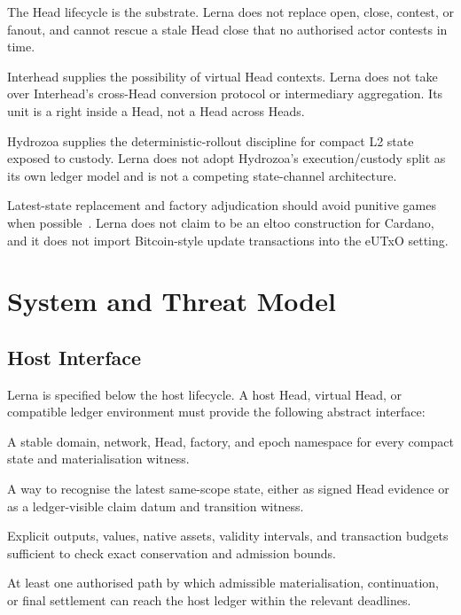 \documentclass[a4paper,11pt]{article}
\theoremstyle{definition}
\theoremstyle{plain}
\theoremstyle{remark}
\begin{document}
\begin{description}[leftmargin=3.8cm,style=nextline]
\item[From Hydra Head.]
The Head lifecycle is the substrate. Lerna does not replace open, close,
contest, or fanout, and cannot rescue a stale Head close that no authorised
actor contests in time.

\item[From Interhead.]
Interhead supplies the possibility of virtual Head contexts. Lerna does not
take over Interhead's cross-Head conversion protocol or intermediary
aggregation. Its unit is a right inside a Head, not a Head across Heads.

\item[From Hydrozoa.]
Hydrozoa supplies the deterministic-rollout discipline for compact L2 state
exposed to custody. Lerna does not adopt Hydrozoa's execution/custody split as
its own ledger model and is not a competing state-channel architecture.

\item[From eltoo, factories, and Perun.]
Latest-state replacement and factory adjudication should avoid punitive games
when possible~\cite{eltoo,factories,perun}. Lerna does not claim to be an eltoo
construction for Cardano, and it does not import Bitcoin-style update
transactions into the eUTxO setting.
\end{description}

\section{System and Threat Model}
\label{sec:system}

\subsection{Host Interface}
\label{sec:host-interface}

Lerna is specified below the host lifecycle. A host Head, virtual Head, or
compatible ledger environment must provide the following abstract interface:

\begin{description}[leftmargin=3.2cm,style=nextline]
\item[Scoped identity.]
A stable domain, network, Head, factory, and epoch namespace for every compact
state and materialisation witness.

\item[Authenticated state evidence.]
A way to recognise the latest same-scope state, either as signed Head evidence
or as a ledger-visible claim datum and transition witness.

\item[Ledger accounting.]
Explicit outputs, values, native assets, validity intervals, and transaction
budgets sufficient to check exact conservation and admission bounds.

\item[Submission path.]
At least one authorised path by which admissible materialisation, continuation,
or final settlement can reach the host ledger within the relevant deadlines.
\end{description}
\end{document}
